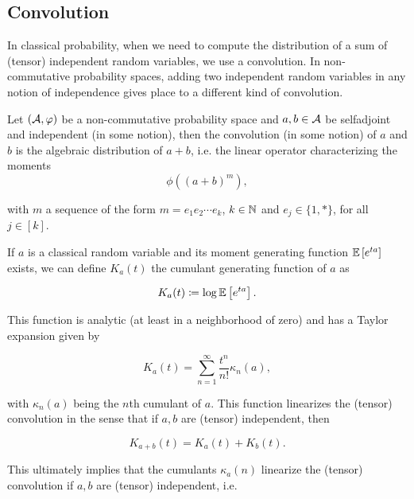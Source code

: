 \subsection{Convolution}

    In classical probability, when we need to compute the distribution of a sum of (tensor) independent random variables, we use a convolution. In non-commutative probability spaces, adding two independent random variables in any notion of independence gives place to a different kind of convolution.

    \begin{definition}
        Let $(\mathcal A,\varphi)$ be a non-commutative probability space and $a,b\in\mathcal A$ be {\color{red} selfadjoint and} independent (in some notion), then the convolution (in some notion) of $a$ and $b$ is the algebraic distribution of $a+b$, i.e. the linear operator characterizing the moments
        \begin{equation*}
            \phi\left((a+b)^{m}\right),
        \end{equation*}

        \noindent with $m$ a sequence of the form $m = e_1 e_2 \cdots e_k$, $k\in \mathbb N$ and $e_j \in \{1,*\}$, for all $j \in [k]$.
    \end{definition}

    If $a$ is a classical random variable and its moment generating function $\mathbb E \left[ e^{ta} \right]$ exists, we can define $K_a(t)$ the cumulant generating function of $a$ as

    \begin{equation*}
        K_a(t) \coloneqq \log \mathbb E \left[  e^{ta}  \right].
    \end{equation*}

    This function is analytic (at least in a neighborhood of zero) and has a Taylor expansion given by

    \begin{equation*}
        K_a(t) =  \sum_{n=1}^\infty \frac{t^n}{n!} \kappa_n(a),
    \end{equation*}

    \noindent with $\kappa_n(a)$ being the $n$th cumulant of $a$. This function linearizes the (tensor) convolution in the sense that if $a,b$ are (tensor) independent, then

    \begin{equation*}
        K_{a+b}(t) = K_a(t)+K_b(t).
    \end{equation*}

    This ultimately implies that the cumulants $\kappa_a(n)$ linearize the (tensor) convolution if $a,b$ are (tensor) independent, i.e.

